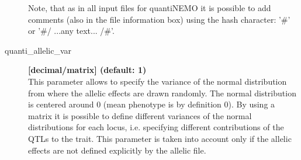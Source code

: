 \documentclass[letterpaper,12pt,oneside]{book}
\begin{document}
\begin{description}
\begin{description}
\end{description} 
Note, that as in all input files for quantiNEMO it is possible to add comments (also in the file information box) using the hash character: '\#' or '\#/ ...any text... /\#'.

\item[quanti\_allelic\_var\index{quanti\_allelic\_var}] \textbf{[decimal/matrix] (default: 1)} \\
This parameter allows to specify the variance of the normal distribution from where the allelic effects are drawn randomly. The normal distribution is centered around 0 (mean phenotype is by definition 0). By using a matrix it is possible to define different variances of the normal distributions for each locus, i.e. specifying different contributions of the QTLs to the trait. This parameter is taken into account only if the allelic effects are not defined explicitly by the allelic file.
\end{description} 
\end{document}
